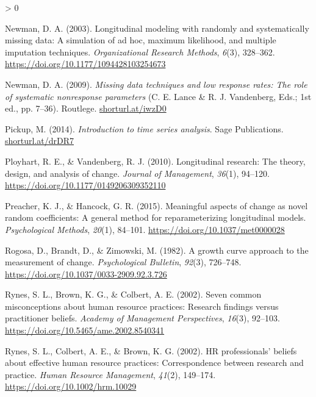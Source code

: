 \documentclass[
12pt, %
twoside,
english]{guelphthesis}
\newlength{\cslhangindent}
\newenvironment{CSLReferences}[2] %
 {%
  \setlength{\parindent}{0pt}
  \ifodd #1 \everypar{\setlength{\hangindent}{\cslhangindent}}\ignorespaces\fi
  \ifnum #2 > 0
  \setlength{\parskip}{\linespacing{2}}
  \fi
 }%
 {}
\begin{document}
\begin{CSLReferences}{1}{0}
\leavevmode{}%
Newman, D. A. (2003). Longitudinal modeling with randomly and systematically missing data: A simulation of ad hoc, maximum likelihood, and multiple imputation techniques. \emph{Organizational Research Methods}, \emph{6}(3), 328--362. \url{https://doi.org/10.1177/1094428103254673}

\leavevmode{}%
Newman, D. A. (2009). \emph{Missing data techniques and low response rates: The role of systematic nonresponse parameters} (C. E. Lance \& R. J. Vandenberg, Eds.; 1st ed., pp. 7--36). Routlege. \href{https://shorturl.at/iwzD0}{shorturl.at/iwzD0}

\leavevmode{}%
Pickup, M. (2014). \emph{Introduction to time series analysis}. Sage Publications. \href{https://shorturl.at/drDR7}{shorturl.at/drDR7}

\leavevmode{}%
Ployhart, R. E., \& Vandenberg, R. J. (2010). Longitudinal research: The theory, design, and analysis of change. \emph{Journal of Management}, \emph{36}(1), 94--120. \url{https://doi.org/10.1177/0149206309352110}

\leavevmode{}%
Preacher, K. J., \& Hancock, G. R. (2015). Meaningful aspects of change as novel random coefficients: A general method for reparameterizing longitudinal models. \emph{Psychological Methods}, \emph{20}(1), 84--101. \url{https://doi.org/10.1037/met0000028}

\leavevmode{}%
Rogosa, D., Brandt, D., \& Zimowski, M. (1982). A growth curve approach to the measurement of change. \emph{Psychological Bulletin}, \emph{92}(3), 726--748. \url{https://doi.org/10.1037/0033-2909.92.3.726}

\leavevmode{}%
Rynes, S. L., Brown, K. G., \& Colbert, A. E. (2002). Seven common misconceptions about human resource practices: Research findings versus practitioner beliefs. \emph{Academy of Management Perspectives}, \emph{16}(3), 92--103. \url{https://doi.org/10.5465/ame.2002.8540341}

\leavevmode{}%
Rynes, S. L., Colbert, A. E., \& Brown, K. G. (2002). HR professionals' beliefs about effective human resource practices: Correspondence between research and practice. \emph{Human Resource Management}, \emph{41}(2), 149--174. \url{https://doi.org/10.1002/hrm.10029}


\end{CSLReferences}
\end{document}
